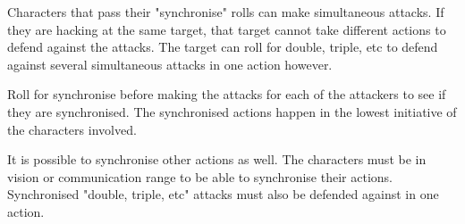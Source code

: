 %
%
%


 Characters that pass their "synchronise" rolls can make simultaneous attacks. If they are hacking at the same target, that target cannot take different actions to defend against the attacks. The target can roll for double, triple, etc to defend against several simultaneous attacks in one action however.

Roll for synchronise before making the attacks for each of the attackers to see if they are synchronised. The synchronised actions happen in the lowest initiative of the characters involved.

It is possible to synchronise other actions as well. The characters must be in vision or communication range to be able to synchronise their actions.
Synchronised "double, triple, etc" attacks must also be defended against in one action.





\closeskillslist


















